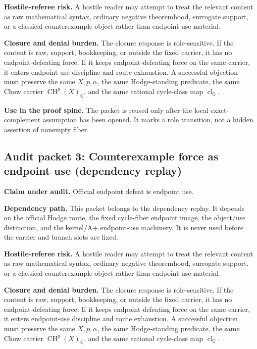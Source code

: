 \documentclass[11pt]{article}
\newcommand{\QQ}{\mathbb{Q}}
\newcommand{\CH}{\operatorname{CH}}
\newcommand{\clQ}{\operatorname{cl}_{\QQ}}
\begin{document}
\par\noindent\textbf{Hostile-referee risk.} A hostile reader may attempt to treat the relevant content as raw mathematical syntax, ordinary negative theoremhood, surrogate support, or a classical counterexample object rather than endpoint-use material.


\par\noindent\textbf{Closure and denial burden.} The closure response is role-sensitive. If the content is raw, support, bookkeeping, or outside the fixed carrier, it has no endpoint-defeating force. If it keeps endpoint-defeating force on the same carrier, it enters endpoint-use discipline and route exhaustion. A successful objection must preserve the same $X,p,\alpha$, the same Hodge-standing predicate, the same Chow carrier $\CH^p(X)_\QQ$, and the same rational cycle-class map $\clQ$.


\par\noindent\textbf{Use in the proof spine.} The packet is reused only after the local exact-complement assumption has been opened. It marks a role transition, not a hidden assertion of nonempty fiber.


\subsection{Audit packet 3: Counterexample force as endpoint use (dependency replay)}


\par\noindent\textbf{Claim under audit.} Official endpoint defeat is endpoint use.


\par\noindent\textbf{Dependency path.} This packet belongs to the dependency replay. It depends on the official Hodge route, the fixed cycle-fiber endpoint image, the object/use distinction, and the kernel/A+ endpoint-use machinery. It is never used before the carrier and branch slots are fixed.


\par\noindent\textbf{Hostile-referee risk.} A hostile reader may attempt to treat the relevant content as raw mathematical syntax, ordinary negative theoremhood, surrogate support, or a classical counterexample object rather than endpoint-use material.


\par\noindent\textbf{Closure and denial burden.} The closure response is role-sensitive. If the content is raw, support, bookkeeping, or outside the fixed carrier, it has no endpoint-defeating force. If it keeps endpoint-defeating force on the same carrier, it enters endpoint-use discipline and route exhaustion. A successful objection must preserve the same $X,p,\alpha$, the same Hodge-standing predicate, the same Chow carrier $\CH^p(X)_\QQ$, and the same rational cycle-class map $\clQ$.
\end{document}

